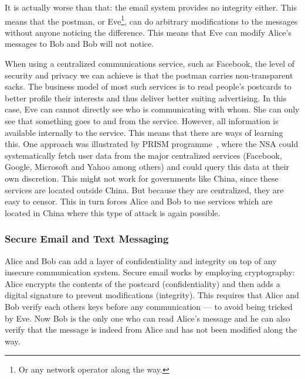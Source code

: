 It is actually worse than that: the email system provides no integrity either.
This means that the postman, or Eve\footnote{%
  Or any network operator along the way.
}, can do arbitrary modifications to the messages without anyone noticing the 
difference.
This means that Eve can modify Alice's messages to Bob and Bob will not notice.

When using a centralized communications service, such as Facebook, the
level of security and privacy we can achieve is that the postman
carries non-transparent sacks.  The business model of most such
services is to read people's postcards to better profile their
interests and thus deliver better suiting advertising.
In this case, Eve can cannot directly see who is communicating with whom.
She can only see that something goes to and from the service.
However, all information is available
internally to the service.  This means that there are ways of learning
this.
One approach was illustrated by  PRISM programme~\cite{Prism}, where 
the \ac{NSA} could systematically fetch user data from the major centralized 
services (Facebook, Google, Microsoft and Yahoo among others) and could query 
this data at their own discretion.
This might not work for governments like China, since these services are 
located outside China.
But because they are centralized, they are easy to censor.
This in turn forces Alice and Bob to use services which are located in China where this 
type of attack is again possible.

\subsubsection{Secure Email and Text Messaging}

Alice and Bob can add a layer of confidentiality and integrity on top of any 
insecure communication system.
Secure email works by employing cryptography: Alice encrypts the contents of 
the postcard (confidentiality) and then adds a digital signature to prevent 
modifications (integrity).
This requires that Alice and Bob verify each others keys before any 
communication --- to avoid being tricked by Eve.
Now Bob is the only one who can read Alice's message and he can also verify 
that the message is indeed from Alice and has not been modified along the way.


